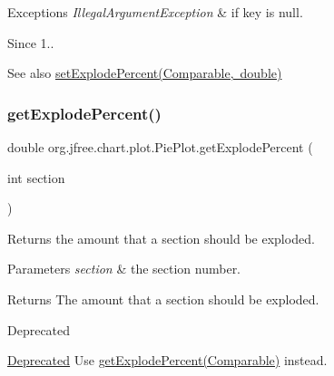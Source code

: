 \begin{DoxyExceptions}{Exceptions}
{\em Illegal\+Argument\+Exception} & if {\ttfamily key} is {\ttfamily null}.\\
\hline
\end{DoxyExceptions}
\begin{DoxySince}{Since}
1..
\end{DoxySince}
\begin{DoxySeeAlso}{See also}
\mbox{\hyperlink{classorg_1_1jfree_1_1chart_1_1plot_1_1_pie_plot_a1532467123505f9c3fee0171804871fa}{set\+Explode\+Percent(\+Comparable, double)}} 
\end{DoxySeeAlso}
\mbox{\label{classorg_1_1jfree_1_1chart_1_1plot_1_1_pie_plot_aa1ef98ca9158ebc50a475842e837be04}} 
\subsubsection{\texorpdfstring{get\+Explode\+Percent()}{getExplodePercent()}\hspace{0.1cm}{\footnotesize\ttfamily [2/2]}}
{\footnotesize\ttfamily double org.\+jfree.\+chart.\+plot.\+Pie\+Plot.\+get\+Explode\+Percent (\begin{DoxyParamCaption}\item[{int}]{section }\end{DoxyParamCaption})}

Returns the amount that a section should be \textquotesingle{}exploded\textquotesingle{}.


\begin{DoxyParams}{Parameters}
{\em section} & the section number.\\
\hline
\end{DoxyParams}
\begin{DoxyReturn}{Returns}
The amount that a section should be \textquotesingle{}exploded\textquotesingle{}.
\end{DoxyReturn}
\begin{DoxyRefDesc}{Deprecated}
\item[\mbox{\hyperlink{deprecated__deprecated000078}{Deprecated}}]Use \mbox{\hyperlink{classorg_1_1jfree_1_1chart_1_1plot_1_1_pie_plot_ab824066f262be4fe291d104aec9be9e7}{get\+Explode\+Percent(\+Comparable)}} instead. \end{DoxyRefDesc}
\mbox{\label{classorg_1_1jfree_1_1chart_1_1plot_1_1_pie_plot_ad2449fa76e41a198e1b8900d8277cbd5}} 
